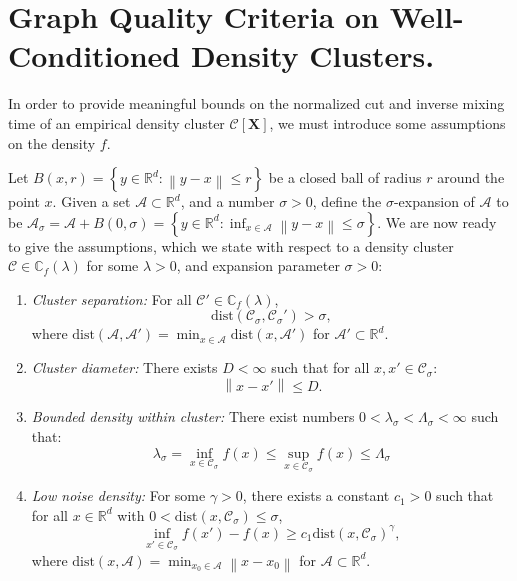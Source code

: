 \documentclass{article}
\newcommand{\diam}{\mathrm{diam}}
\newcommand{\set}[1]{\left\{#1\right\}}
\newcommand{\Reals}{\mathbb{R}}
\newcommand{\Rd}{\Reals^d}
\newcommand{\norm}[1]{\left\lVert#1\right\rVert}
\newcommand{\1}{\mathbf{1}}
\newcommand{\dist}{\mathrm{dist}}
\newcommand{\Xbf}{\mathbf{X}}
\newcommand{\Cbb}{\mathbb{C}}
\newcommand{\Cset}{\mathcal{C}}
\newcommand{\Aset}{\mathcal{A}}
\newcommand{\Asig}{\Aset_{\sigma}}
\newcommand{\Csig}{\Cset_{\sigma}}
\theoremstyle{aldenthm}
\theoremstyle{aldenrmrk}
\begin{document}
\section{Graph Quality Criteria on Well-Conditioned Density Clusters.}
\label{sec: background}

In order to provide meaningful bounds on the normalized cut and inverse mixing time of an empirical density cluster $\Cset[\Xbf]$, we must introduce some assumptions on the density $f$. 

Let $B(x,r) = \set{y \in \Rd: \norm{y - x} \leq r}$ be a closed ball of radius $r$ around the point $x$.  Given a set $\Aset \subset \Rd$, and a number $\sigma > 0$, define the $\sigma$-expansion of $\Aset$ to be $\Asig = \Aset + B(0,\sigma) = \set{y \in \Rd: \inf_{x \in \Aset} \norm{y - x} \leq \sigma}$. We are now ready to give the assumptions, which we state with respect to a density cluster $\Cset \in \Cbb_f(\lambda)$ for some $\lambda > 0$, and expansion parameter $\sigma > 0$:
\begin{enumerate}[label=(A\arabic*)]
	\item
	\label{asmp: cluster_separation}
	\textit{Cluster separation:}
	For all $\Cset' \in \Cbb_f(\lambda)$,
	\begin{equation*}
	\dist(\Csig,\Csig') > \sigma,
	\end{equation*}
	where $\dist(\Aset,\Aset') = \min_{x \in \Aset} \dist(x,\Aset')$ for $\Aset' \subset \Rd$. 
	
	\item
	\label{asmp: cluster_diameter}
	\textit{Cluster diameter:}
	There exists $D < \infty$ such that for all $x, x' \in \Csig$:
	\begin{equation*}
	\norm{x - x'} \leq D.
	\end{equation*}
	
	\item
	\label{asmp: bounded_density}
	\textit{Bounded density within cluster:} There exist numbers $0 < \lambda_{\sigma} <  \Lambda_{\sigma} < \infty$ such that:
	\begin{equation}
	\label{eqn: bounded_density}
	\lambda_{\sigma} = \inf_{x \in \Csig} f(x) \leq \sup_{x \in \Csig} f(x) \leq \Lambda_{\sigma} 
	\end{equation} 
	
	\item 
	\label{asmp: low_noise_density}
	\textit{Low noise density:} For some $\gamma > 0 $, there exists a constant $c_1 > 0$ such that for all $x \in \Rd$ with $0 < \dist(x, \Csig) \leq \sigma$,
	\begin{equation*}
	\inf_{x' \in \Csig} f(x') - f(x) \geq c_1 \dist(x, \Csig)^{\gamma},
	\end{equation*}
	where $\dist(x,\Aset) = \min_{x_0 \in \Aset} \norm{x - x_0}$ for $\Aset \subset \Rd$.
\end{enumerate}
\end{document}
